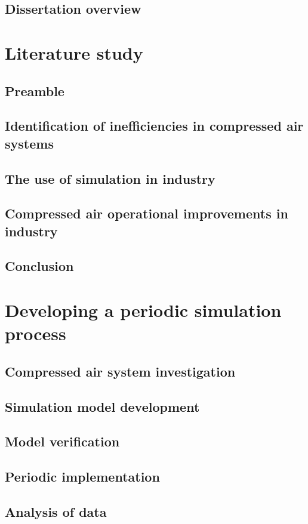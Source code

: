 \documentclass[12pt, english, oneside, singlespacing, open=any]{report}
\begin{document}
	 \section{Dissertation overview}
 
\chapter{Literature study}
	\section{Preamble}
	\section{Identification of inefficiencies in compressed air systems}
	\section{The use of simulation in industry}
	\section{Compressed air operational improvements in industry}
	\section{Conclusion}

\chapter{Developing a periodic simulation process}
	\section{Compressed air system investigation}
	\section{Simulation model development}
	\section{Model verification}
	\section{Periodic implementation}
	\section{Analysis of data}
\end{document}
